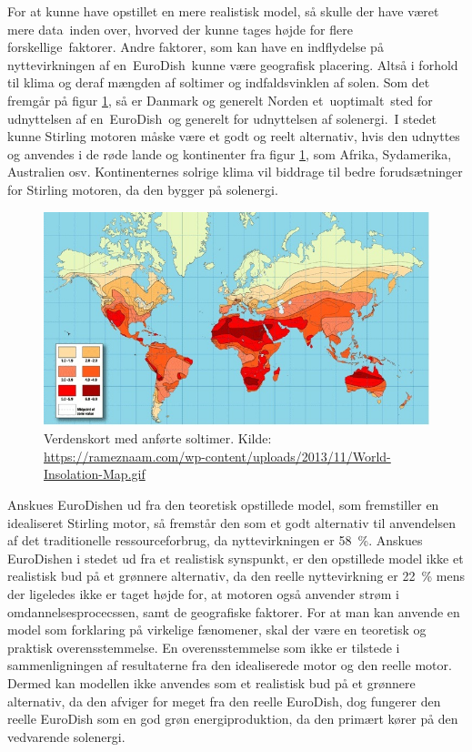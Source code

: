 \documentclass[SRC.tex]{subfiles}
\begin{document}
	For at kunne have opstillet en mere realistisk model, så skulle der have været mere data inden over, hvorved der kunne tages højde for flere forskellige faktorer. Andre faktorer, som kan have en indflydelse på nyttevirkningen af en EuroDish kunne være geografisk placering. Altså i forhold til klima og deraf mængden af soltimer og indfaldsvinklen af solen. Som det fremgår på figur \ref{fig:world-solar-isolation-map}, så er Danmark og generelt Norden et uoptimalt sted for udnyttelsen af en EuroDish og generelt for udnyttelsen af solenergi. I stedet kunne Stirling motoren måske være et godt og reelt alternativ, hvis den udnyttes og anvendes i de røde lande og kontinenter fra figur \ref{fig:world-solar-isolation-map}, som Afrika, Sydamerika, Australien osv. Kontinenternes solrige klima vil biddrage til bedre forudsætninger for Stirling motoren, da den bygger på solenergi. 
	
	\begin{figure}[h!]
		\centering
		\includegraphics[width=0.7\linewidth]{"Billeder/World solar isolation map"}
		\caption{Verdenskort med anførte soltimer. Kilde: \url{https://rameznaam.com/wp-content/uploads/2013/11/World-Insolation-Map.gif}}
		\label{fig:world-solar-isolation-map}
	\end{figure}
	Anskues EuroDishen ud fra den teoretisk opstillede model, som fremstiller en idealiseret Stirling motor, så fremstår den som et godt alternativ til anvendelsen af det traditionelle ressourceforbrug, da nyttevirkningen er \SI{58}{\percent}. Anskues EuroDishen i stedet ud fra et realistisk synspunkt, er den opstillede model ikke et realistisk bud på et grønnere alternativ, da den reelle nyttevirkning er \SI{22}{\percent} mens der ligeledes ikke er taget højde for, at motoren også anvender strøm i omdannelsesprocecssen, samt de geografiske faktorer. For at man kan anvende en model som forklaring på virkelige fænomener, skal der være en teoretisk og praktisk overensstemmelse. En overensstemmelse som ikke er tilstede i sammenligningen af resultaterne fra den idealiserede motor og den reelle motor. Dermed kan modellen ikke anvendes som et realistisk bud på et grønnere alternativ, da den afviger for meget fra den reelle EuroDish, dog fungerer den reelle EuroDish som en god grøn energiproduktion, da den primært kører på den vedvarende solenergi. 
	
	
\end{document}
